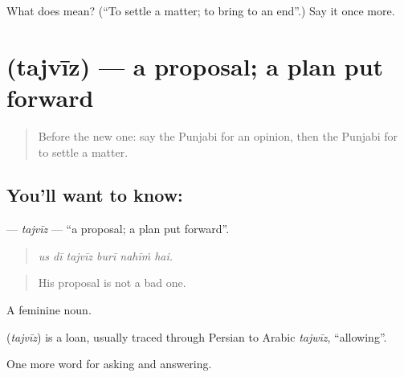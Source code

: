 \begin{tcolorbox}[breakable,colback=teal!4,colframe=teal!35!black,title={Before you move on}]
What does  mean? (\textquotedblleft{}To settle a matter; to bring to an end\textquotedblright{}.) Say it once more.
\end{tcolorbox}
\section[\texorpdfstring{\pa{ਤਜਵੀਜ਼} (tajvīz)}{ਤਜਵੀਜ਼ (tajvīz)}]{ (tajvīz) — a proposal; a plan put forward}

\label{lesson:PA-C345-tajviz}



\begin{quote}
Before the new one: say the Punjabi for an opinion, then the Punjabi for to settle a matter.
\end{quote}

\subsection*{You'll want to know: }
\textbf{} — \emph{tajvīz} — \textquotedblleft{}a proposal; a plan put forward\textquotedblright{}.

\begin{quote}
     
\end{quote}

\begin{quote}
\emph{us dī tajvīz burī nahīṁ hai.}
\end{quote}

\begin{quote}
His proposal is not a bad one.
\end{quote}

A feminine noun.

\begin{cousinweb}
\textbf{} (\emph{tajvīz}) is a loan, usually traced through Persian to Arabic \emph{tajwīz}, \textquotedblleft{}allowing\textquotedblright{}.
\end{cousinweb}

\begin{grammarlens}[title={What you've built}]
One more word for asking and answering.
\end{grammarlens}

